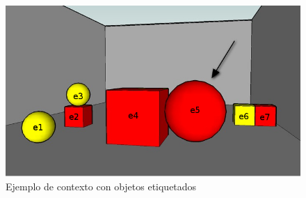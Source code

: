\begin{figure}[!ht]
\begin{minipage}[t]{0.5\linewidth}
\centering
\includegraphics[width=\textwidth]{images/22.jpg}
\caption{Ejemplo de contexto con objetos etiquetados}
\label{GRE3D7-stimulus2}


\end{minipage}
\end{figure}
